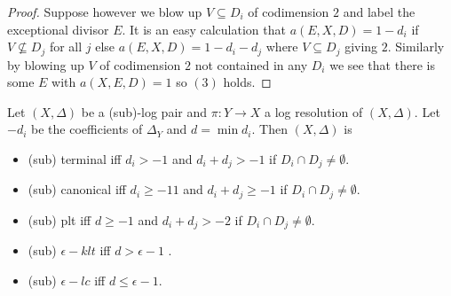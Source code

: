 \documentclass[a4paper,12pt]{book}
\begin{document}
\begin{proof}
	 Suppose however we blow up $V\subseteq D_{i}$ of codimension $2$ and label the exceptional divisor $E$. It is an easy calculation that $a(E,X,D)=1-d_{i}$ if $V\not\subseteq D_{j}$ for all $j$ else $a(E,X,D)=1-d_{i}-d_{j}$ where $V \subseteq D_{j}$ giving $2$. Similarly by blowing up $V$ of codimension $2$ not contained in any $D_{i}$ we see that there is some $E$ with $a(X,E,D)=1$ so $(3)$ holds.
	 
\end{proof}






\begin{corollary}
	Let $(X,\Delta)$ be a (sub)-log pair and $\pi:Y\to X$ a log resolution of $(X,\Delta)$. Let $-d_{i}$ be the coefficients of $\Delta_{Y}$ and $d=\min d_{i}.$
	Then $(X,\Delta)$ is
	\begin{itemize}
		\item 	(sub) terminal iff $d_{i} > -1$ and $d_{i}+d_{j} > -1$ if $D_{i} \cap D_{j} \neq \emptyset$.
		\item	(sub) canonical iff $d_{i} \geq -1 1$ and $d_{i}+d_{j} \geq - 1$ if $D_{i} \cap D_{j} \neq \emptyset$. 
		\item 	(sub) plt iff $d \geq -1$ and $d_{i}+d_{j} > -2$ if $D_{i} \cap D_{j} \neq \emptyset$.
		\item	(sub) $\epsilon-klt$ iff $d > \epsilon-1$ .
		\item	(sub) $\epsilon-lc$ iff $d \leq \epsilon-1$.
	\end{itemize}
\end{corollary}
\end{document}
